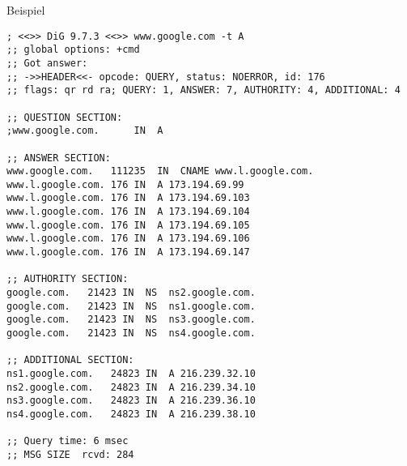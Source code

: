 \documentclass{beamer}
\begin{document}
  \begin{frame}[fragile]{\mytitle}{Beispiel}
    \tiny
    \begin{verbatim}
; <<>> DiG 9.7.3 <<>> www.google.com -t A
;; global options: +cmd
;; Got answer:
;; ->>HEADER<<- opcode: QUERY, status: NOERROR, id: 176
;; flags: qr rd ra; QUERY: 1, ANSWER: 7, AUTHORITY: 4, ADDITIONAL: 4

;; QUESTION SECTION:
;www.google.com.      IN  A

;; ANSWER SECTION:
www.google.com.   111235  IN  CNAME www.l.google.com.
www.l.google.com. 176 IN  A 173.194.69.99
www.l.google.com. 176 IN  A 173.194.69.103
www.l.google.com. 176 IN  A 173.194.69.104
www.l.google.com. 176 IN  A 173.194.69.105
www.l.google.com. 176 IN  A 173.194.69.106
www.l.google.com. 176 IN  A 173.194.69.147

;; AUTHORITY SECTION:
google.com.   21423 IN  NS  ns2.google.com.
google.com.   21423 IN  NS  ns1.google.com.
google.com.   21423 IN  NS  ns3.google.com.
google.com.   21423 IN  NS  ns4.google.com.

;; ADDITIONAL SECTION:
ns1.google.com.   24823 IN  A 216.239.32.10
ns2.google.com.   24823 IN  A 216.239.34.10
ns3.google.com.   24823 IN  A 216.239.36.10
ns4.google.com.   24823 IN  A 216.239.38.10

;; Query time: 6 msec
;; MSG SIZE  rcvd: 284
    \end{verbatim}
\end{frame}


\end{document}

